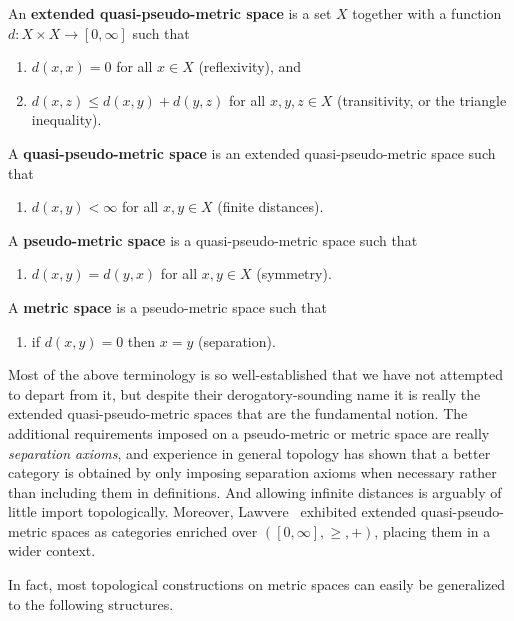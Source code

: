 \documentclass{article}
\def\Rp{[0,\infty]}
\begin{document}
\begin{defn}
  An \textbf{extended quasi-pseudo-metric space} is a set $X$ together with a function $d:X\times X \to \Rp$ such that
  \begin{enumerate}
  \item $d(x,x)=0$ for all $x\in X$ (reflexivity), and
  \item $d(x,z)\le d(x,y)+d(y,z)$ for all $x,y,z\in X$ (transitivity, or the triangle inequality).
  \end{enumerate}
  A \textbf{quasi-pseudo-metric space} is an extended quasi-pseudo-metric space such that
  \begin{enumerate}[resume]
  \item $d(x,y)<\infty$ for all $x,y\in X$ (finite distances).
  \end{enumerate}
  A \textbf{pseudo-metric space} is a quasi-pseudo-metric space such that
  \begin{enumerate}[resume]
  \item $d(x,y)=d(y,x)$ for all $x,y\in X$ (symmetry).
  \end{enumerate}
  A \textbf{metric space} is a pseudo-metric space such that
  \begin{enumerate}[resume]
  \item if $d(x,y)=0$ then $x=y$ (separation).
  \end{enumerate}
\end{defn}

Most of the above terminology is so well-established that we have not attempted to depart from it, but despite their derogatory-sounding name it is really the extended quasi-pseudo-metric spaces that are the fundamental notion.
The additional requirements imposed on a pseudo-metric or metric space are really \emph{separation axioms}, and experience in general topology has shown that a better category is obtained by only imposing separation axioms when necessary rather than including them in definitions.
And allowing infinite distances is arguably of little import topologically.
Moreover, Lawvere~\cite{lawvere:metric-spaces} exhibited extended quasi-pseudo-metric spaces as categories enriched over $(\Rp,\ge,+)$, placing them in a wider context.

In fact, most topological constructions on metric spaces can easily be generalized to the following structures.
\end{document}
